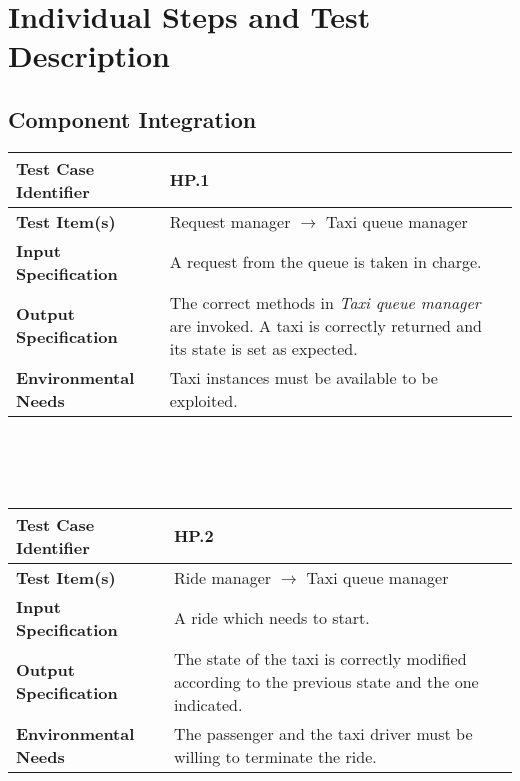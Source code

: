 \section{Individual Steps and Test Description}
\subsection{Component Integration}

{\renewcommand{\arraystretch}{1.5}

\begin{tabularx}{\textwidth}{l X}
    \hline 
    \textbf{Test Case Identifier} & HP.1\\ 
    \hline 
    
    \textbf{Test Item(s)} & Request manager $\rightarrow$ Taxi queue manager\\
    \hline 
    
    \textbf{Input Specification} & A request from the queue is taken in charge.\\
    \hline 
    
    \textbf{Output Specification} & The correct methods in \textit{Taxi queue manager} are invoked. A taxi is correctly returned and its state is set as expected. \\
    \hline 
    
    \textbf{Environmental Needs} & Taxi instances must be available to be exploited.  \\
    \hline

\end{tabularx}
\\ \\ \\
\begin{tabularx}{\textwidth}{l X}
    \hline 
    \textbf{Test Case Identifier} & HP.2\\ 
    \hline 
    
    \textbf{Test Item(s)} & Ride manager $\rightarrow$ Taxi queue manager\\
    \hline 
    
    \textbf{Input Specification} & A ride which needs to start.\\
    \hline 
    
    \textbf{Output Specification} & The state of the taxi is correctly modified according to the previous state and the one indicated.\\
    \hline 
    
    \textbf{Environmental Needs} & The passenger and the taxi driver must be willing to terminate the ride.\\
    \hline


\end{tabularx}}

